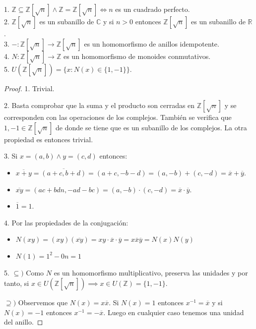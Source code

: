\begin{proposition}
1. $\mathbb{Z} \subseteq \mathbb{Z}[\sqrt{n}] \land \mathbb{Z} = \mathbb{Z}[\sqrt{n}] \iff n$ es un cuadrado perfecto. \\
2. $\mathbb{Z}[\sqrt{n}]$ es un subanillo de $\mathbb{C}$ y si $n > 0$ entonces $\mathbb{Z}[\sqrt{n}]$ es un subanillo de $\mathbb{R}$. \\
3. $-:\mathbb{Z}[\sqrt{n}] \to \mathbb{Z}[\sqrt{n}]$ es un homomorfismo de anillos idempotente.\\
4. $N:\mathbb{Z}[\sqrt{n}] \to \mathbb{Z}$ es un homomorfismo de monoides conmutativos.\\
5. $U(\mathbb{Z}[\sqrt{n}]) = \{x: N(x) \in \{1, -1\}\}$. 
\end{proposition}
\begin{proof}
1. Trivial.

2. Basta comprobar que la suma y el producto son cerradas en $\mathbb{Z}[\sqrt{n}]$ y se corresponden con las operaciones de los complejos. También se verifica que $1,-1 \in \mathbb{Z}[\sqrt{n}]$ de donde se tiene que es un subanillo de los complejos. La otra propiedad es entonces trivial. 

3. Si $x = (a,b) \land y = (c,d)$ entonces:

\begin{itemize}
\item $\overline{x+y} = \overline{(a+c,b+d)} = (a+c,-b-d) = (a,-b) + (c,-d) = \overline{x} + \overline{y}$.
\item $\overline{xy} = (ac+bdn,-ad-bc) = (a,-b) \cdot (c,-d) = \overline{x} \cdot \overline{y}$.
\item $\overline{1} = 1$. 
\end{itemize} 

4. Por las propiedades de la conjugación:

\begin{itemize}
\item $N(xy) = (xy)(\overline{xy}) = xy \cdot \overline{x} \cdot \overline{y} = x \overline{x}\overline{y} = N(x)N(y)$
\item $N(1) = 1^2-0n = 1$
\end{itemize}

5. $\subseteq)$ Como $N$ es un homomorfismo multiplicativo, preserva las unidades y por tanto, si $x \in U(\mathbb{Z}[\sqrt{n}]) \implies x \in U(\mathbb{Z}) = \{1,-1\}$.

$\supseteq)$ Observemos que $N(x) = x\overline{x}$. Si $N(x) = 1$ entonces $x^{-1} = \overline{x}$ y si $N(x) = -1$ entonces  $x^{-1} = - \overline{x}$. Luego en cualquier caso tenemos una unidad del anillo.  
\end{proof}


